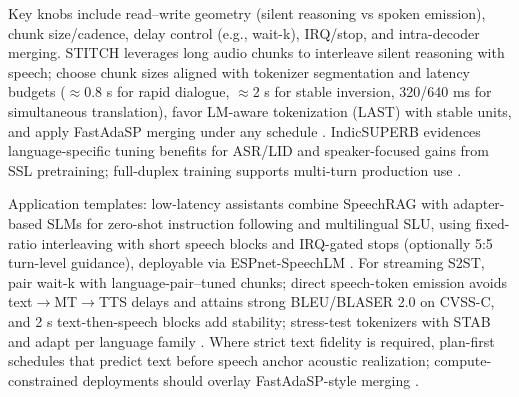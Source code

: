 \documentclass{article}
\begin{document}
Key knobs include read--write geometry (silent reasoning vs spoken emission), chunk size/cadence, delay control (e.g., wait-k), IRQ/stop, and intra-decoder merging. STITCH leverages long audio chunks to interleave silent reasoning with speech; choose chunk sizes aligned with tokenizer segmentation and latency budgets ($\approx$0.8 s for rapid dialogue, $\approx$2 s for stable inversion, 320/640 ms for simultaneous translation), favor LM-aware tokenization (LAST) with stable units, and apply FastAdaSP merging under any schedule \cite{chiang2025stitchsimultaneousthinkingtalkingchunked,turetzky2024lastlanguagemodelawarespeechtokenization,lu2024fastadaspmultitaskadaptedefficientinfere,vashishth2024stabspeechtokenizerassessmentbenchmark,kando2025exploringeffectsegmentationvocabularysiz,guo2025streamuniachievingstreamingspeechtransla}. IndicSUPERB evidences language-specific tuning benefits for ASR/LID and speaker-focused gains from SSL pretraining; full-duplex training supports multi-turn production use \cite{entry2025indicsuperbspeechprocessinguniversalperf,yang2024buildingtaiwanesemandarinspokenlanguagem}.

Application templates: low-latency assistants combine SpeechRAG with adapter-based SLMs for zero-shot instruction following and multilingual SLU, using fixed-ratio interleaving with short speech blocks and IRQ-gated stops (optionally 5:5 turn-level guidance), deployable via ESPnet-SpeechLM \cite{min2025speechretrievalaugmentedgenerationwithou,wang2023slmbridgethingapbetweenspeechtextfoundat,tian2025espnetspeechlmopenspeechlanguagemodeltoo,entry2025indicsuperbspeechprocessinguniversalperf}. For streaming S2ST, pair wait-k with language-pair--tuned chunks; direct speech-token emission avoids text$\rightarrow$MT$\rightarrow$TTS delays and attains strong BLEU/BLASER 2.0 on CVSS-C, and 2 s text-then-speech blocks add stability; stress-test tokenizers with STAB and adapt per language family \cite{zhao2024textlessstreamingspeechtranslationsemant,entry2025indicsuperbspeechprocessinguniversalperf,vashishth2024stabspeechtokenizerassessmentbenchmark}. Where strict text fidelity is required, plan-first schedules that predict text before speech anchor acoustic realization; compute-constrained deployments should overlay FastAdaSP-style merging \cite{turetzky2024lastlanguagemodelawarespeechtokenization,wu2023speechgenunlockinggenerativepowerspeechl,lu2024fastadaspmultitaskadaptedefficientinfere}.
\end{document}
